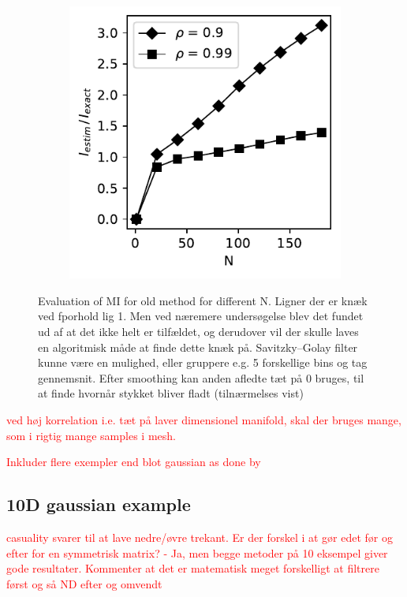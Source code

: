 \documentclass[../Thesis.tex]{subfiles}
\begin{document}
\begin{figure}[h]
\begin{subfigure}[t]{0.32\textwidth}
        \caption{}
        \label{subfig:dd}
    \end{subfigure}%
    ~
    \begin{subfigure}[t]{0.32\textwidth}
        \centering
        \includegraphics[width=\linewidth]{figures/ND examples/MI calc/gaussian example original high corr.pdf}
        \caption{}
        \label{subfig:dd}
    \end{subfigure}
    \caption{Evaluation of MI for old method for different N. Ligner der er knæk ved fporhold lig 1. Men ved næremere undersøgelse blev det fundet ud af at det ikke helt er tilfældet, og derudover vil der skulle laves en algoritmisk måde at finde dette knæk på. Savitzky–Golay filter kunne være en mulighed, eller gruppere e.g. 5 forskellige bins og tag gennemsnit. Efter smoothing kan anden afledte tæt på 0 bruges, til at finde hvornår stykket bliver fladt (tilnærmelses vist)}
    \label{fig:ddd}
\end{figure}

\textcolor{red}{ved høj korrelation i.e. tæt på laver dimensionel manifold, skal der bruges mange, som i rigtig mange samples i mesh. }


\textcolor{red}{Inkluder flere exempler end blot gaussian as done by \cite{Estimating-mutual-information-Kraskov}}

\subsection{10D gaussian example}
\textcolor{red}{casuality svarer til at lave nedre/øvre trekant. Er der forskel i at gør edet før og efter for en symmetrisk matrix? - Ja, men begge metoder på 10 eksempel giver gode resultater. Kommenter at det er matematisk meget forskelligt at filtrere først og så ND efter og omvendt}
\end{document}
